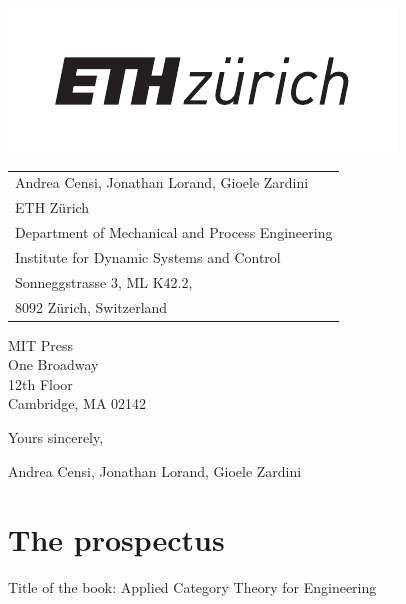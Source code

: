 \documentclass[10pt, article, one side]{memoir}
\begin{document}
    \begin{minipage}{0.45\linewidth}
        \includegraphics[width=0.9\linewidth]{pics/ethlogo.pdf}
        \vfill
    \end{minipage}
    \begin{minipage}{0.5\linewidth}
        \begin{flushright}
            \begin{tabular}{l}
                Andrea Censi, Jonathan Lorand, Gioele Zardini \\
                ETH Z\"urich \\
                Department of Mechanical and Process Engineering \\
                Institute for Dynamic Systems and Control \\
                Sonneggstrasse 3, ML K42.2, \\
                8092 Z\"urich, Switzerland
            \end{tabular}
        \end{flushright}
    \end{minipage}

    \vspace{1cm}

    \noindent MIT Press\\
    \noindent One Broadway\\
    \noindent 12th Floor \\
    \noindent Cambridge, MA 02142\\[+7pt]


    \noindent Yours sincerely,

    \noindent \hspace{10cm} Andrea Censi, Jonathan Lorand, Gioele Zardini

    \newpage

    \chapter{The prospectus}
    Title of the book: Applied Category Theory for Engineering
\end{document}

